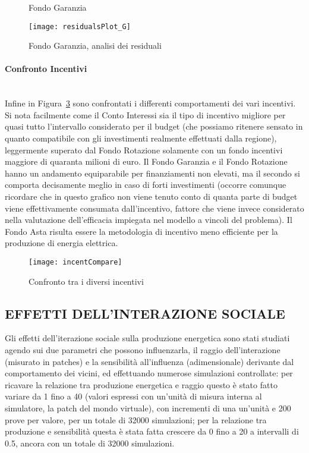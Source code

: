 \documentclass[12pt,a4paper,openright,twoside]{report}
\newcommand{\myparagraph}[1]{\paragraph{#1}\mbox{}\\}
\begin{document}
\begin{figure}[H]
	\centering
	\qquad
	\caption{Fondo Garanzia}
	\label{graphSimG}
\end{figure}

\begin{figure}[hbt]
	\centering
	\texttt{[image: residualsPlot\_G]}
	\caption{Fondo Garanzia, analisi dei residuali}
	\label{residualsPlot_G}
\end{figure}

\myparagraph{Confronto Incentivi}

Infine in Figura~\ref{incentCompare} sono confrontati i differenti comportamenti dei vari incentivi. Si nota facilmente come il Conto Interessi sia il tipo di incentivo migliore per quasi tutto l'intervallo considerato per il budget (che possiamo ritenere sensato in quanto compatibile con gli investimenti realmente effettuati dalla regione), leggermente superato dal Fondo Rotazione solamente con un fondo incentivi maggiore di quaranta milioni di euro. Il Fondo Garanzia e il Fondo Rotazione hanno un andamento equiparabile per finanziamenti non elevati, ma il secondo si comporta decisamente meglio in caso di forti investimenti (occorre comunque ricordare che in questo grafico non viene tenuto conto di quanta parte di budget viene effettivamente consumata dall'incentivo, fattore che viene invece considerato nella valutazione dell'efficacia impiegata nel modello a vincoli del problema). Il Fondo Asta risulta essere la metodologia di incentivo meno efficiente per la produzione di energia elettrica.

\begin{figure}[hbt]
	\centering
	\texttt{[image: incentCompare]}
	\caption{Confronto tra i diversi incentivi}
	\label{incentCompare}
\end{figure}

\subsection{EFFETTI DELL'INTERAZIONE SOCIALE}

Gli effetti dell'iterazione sociale sulla produzione energetica sono stati studiati agendo sui due parametri che possono influenzarla, il raggio dell'interazione (misurato in patches) e la sensibilità all'influenza (adimensionale) derivante dal comportamento dei vicini, ed effettuando numerose simulazioni controllate: per ricavare la relazione tra produzione energetica e raggio questo è stato fatto variare da 1 fino a 40 (valori espressi con un'unità di misura interna al simulatore, la patch del mondo virtuale), con incrementi di una un'unità e 200 prove per valore, per un totale di 32000 simulazioni; per la relazione tra produzione e sensibilità questa è stata fatta crescere da 0 fino a 20 a intervalli di 0.5, ancora con un totale di 32000 simulazioni.
\end{document}
